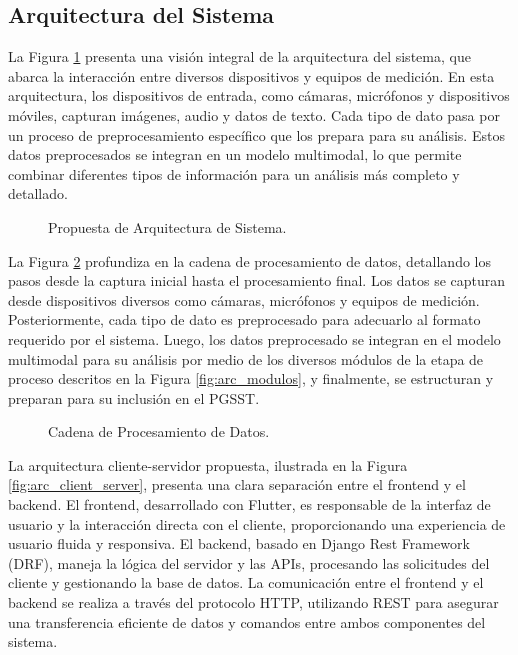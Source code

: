 \subsection{Arquitectura del Sistema}

La Figura \ref{fig:arc_sys} presenta una visión integral de la arquitectura del sistema, que abarca la interacción entre diversos dispositivos y equipos de medición. En esta arquitectura, los dispositivos de entrada, como cámaras, micrófonos y dispositivos móviles, capturan imágenes, audio y datos de texto. Cada tipo de dato pasa por un proceso de preprocesamiento específico que los prepara para su análisis. Estos datos preprocesados se integran en un modelo multimodal, lo que permite combinar diferentes tipos de información para un análisis más completo y detallado. 

\begin{figure}[H]
	\centering
    \resizebox{\textwidth}{!}{
        {\setlength{\fboxsep}{14pt} %
        \fbox{}}}
	\caption{Propuesta de Arquitectura de Sistema.}
	\label{fig:arc_sys} 
\end{figure}

La Figura \ref{fig:basic_data_pipeline} profundiza en la cadena de procesamiento de datos, detallando los pasos desde la captura inicial hasta el procesamiento final. Los datos se capturan desde dispositivos diversos como cámaras, micrófonos y equipos de medición. Posteriormente, cada tipo de dato es preprocesado para adecuarlo al formato requerido por el sistema. Luego, los datos preprocesado se integran en el modelo multimodal para su análisis por medio de los diversos módulos de la etapa de proceso descritos en la Figura \ref{fig:arc_modulos}, y finalmente, se estructuran y preparan para su inclusión en el PGSST.

\begin{figure}[h]
	\centering
    \resizebox{\textwidth}{!}{
        {\setlength{\fboxsep}{14pt} %
        \fbox{}}}
	\caption{Cadena de Procesamiento de Datos.}
	\label{fig:basic_data_pipeline} 
\end{figure}

La arquitectura cliente-servidor propuesta, ilustrada en la Figura \ref{fig:arc_client_server}, presenta una clara separación entre el frontend y el backend. El frontend, desarrollado con Flutter, es responsable de la interfaz de usuario y la interacción directa con el cliente, proporcionando una experiencia de usuario fluida y responsiva. El backend, basado en Django Rest Framework (DRF), maneja la lógica del servidor y las APIs, procesando las solicitudes del cliente y gestionando la base de datos. La comunicación entre el frontend y el backend se realiza a través del protocolo HTTP, utilizando REST para asegurar una transferencia eficiente de datos y comandos entre ambos componentes del sistema.

